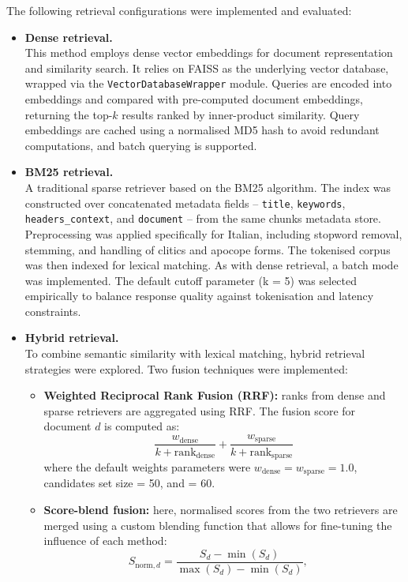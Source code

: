 \begin{spacing}{1.5}
The following retrieval configurations were implemented and evaluated:
\begin{itemize}
    \item \textbf{Dense retrieval.}\\
    This method employs dense vector embeddings for document representation and similarity search. It relies on FAISS as the underlying vector database, wrapped via the \texttt{VectorDatabaseWrapper} module. Queries are encoded into embeddings and compared with pre-computed document embeddings, returning the top-$k$ results ranked by inner-product similarity. Query embeddings are cached using a normalised MD5 hash to avoid redundant computations, and batch querying is supported.
    \item \textbf{BM25 retrieval.}\\ 
    A traditional sparse retriever based on the BM25 algorithm. The index was constructed over concatenated metadata fields -- \texttt{title}, \texttt{keywords}, \texttt{headers\_context}, and \texttt{document} -- from the same chunks metadata store. Preprocessing was applied specifically for Italian, including stopword removal, stemming, and handling of clitics and apocope forms. The tokenised corpus was then indexed for lexical matching. As with dense retrieval, a batch mode was implemented. The default cutoff parameter (k = 5) was selected empirically to balance response quality against tokenisation and latency constraints.
    \item \textbf{Hybrid retrieval.}\\ 
    To combine semantic similarity with lexical matching, hybrid retrieval strategies were explored. Two fusion techniques were implemented:
    \begin{itemize}
            \item \textbf{Weighted Reciprocal Rank Fusion (RRF):} ranks from dense and sparse retrievers are aggregated using RRF. The fusion score for document $d$ is computed as:
\[
\frac{w_\mathrm{dense}}{k + \mathrm{rank}_\mathrm{dense}} + \frac{w_\mathrm{sparse}}{k + \mathrm{rank}_\mathrm{sparse}}
\]
where the default weights parameters were $w_{\text{dense}} = w_{\text{sparse}} = 1.0$, candidates set size = 50, and  = 60.
            \item \textbf{Score-blend fusion:} here, normalised scores from the two retrievers are merged using a custom blending function that allows for fine-tuning the influence of each method:
\[
S_{\text{norm},d} = \frac{S_d - \min(S_d)}{\max(S_d) - \min(S_d)}, \quad  
\]
\end{itemize}
\end{itemize}
\end{spacing}
